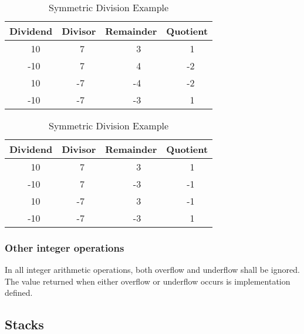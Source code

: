 \begin{table}[ht]
  \begin{minipage}{0.5\textwidth}
	\begin{center}
		\caption{Floored Division Example}

		\label{table:floor}
		\begin{tabular}{lrllrllrllrl}
		\hline\hline
		\multicolumn{3}{c}{Dividend} &
		\multicolumn{3}{c}{Divisor} &
		\multicolumn{3}{c}{Remainder} &
		\multicolumn{3}{c}{Quotient} \\
		\hline
		&  10 &&&  7 &&&  3 &&&  1 \\
		& -10 &&&  7 &&&  4 &&& -2 \\
		&  10 &&& -7 &&& -4 &&& -2 \\
		& -10 &&& -7 &&& -3 &&&  1 \\
		\hline\hline
		\end{tabular}
	\end{center}
  \end{minipage}
  \begin{minipage}{0.5\textwidth}
	\begin{center}
		\caption{Symmetric Division Example}
		\label{table:round}
		\begin{tabular}{lrllrllrllrl}
		\hline\hline
		\multicolumn{3}{c}{Dividend} &
		\multicolumn{3}{c}{Divisor} &
		\multicolumn{3}{c}{Remainder} &
		\multicolumn{3}{c}{Quotient} \\
		\hline
		&  10 &&&  7 &&&  3 &&&  1 \\
		& -10 &&&  7 &&& -3 &&& -1 \\
		&  10 &&& -7 &&&  3 &&& -1 \\
		& -10 &&& -7 &&& -3 &&&  1 \\
		\hline\hline
		\end{tabular}
	\end{center}
  \end{minipage}
\end{table}

\subsubsection{Other integer operations} %
\label{usage:intops}

In all integer arithmetic operations, both overflow and underflow
shall be ignored. The value returned when either overflow or
underflow occurs is implementation defined.

\subsection{Stacks} %

